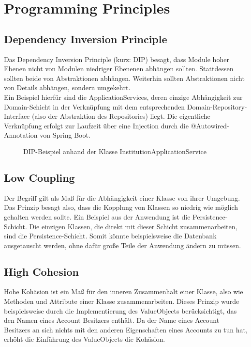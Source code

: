 \section{Programming Principles}
\subsection{Dependency Inversion Principle}
\label{chap:dip}
Das Dependency Inversion Principle (kurz: DIP) besagt, dass Module hoher Ebenen nicht von Modulen niedriger Ebenenen abhängen sollten. Stattdessen sollten beide von Abstraktionen abhängen. Weiterhin sollten Abstraktionen nicht von Details abhängen, sondern umgekehrt.\\
Ein Beispiel hierfür sind die ApplicationServices, deren einzige Abhängigkeit zur Domain-Schicht in der Verknüpfung mit dem entsprechenden Domain-Repository-Interface (also der Abstraktion des Repositories) liegt. Die eigentliche Verknüpfung erfolgt zur Laufzeit über eine Injection durch die @Autowired-Annotation von Spring Boot.
\vspace*{0.5cm}
\begin{figure}[!htb]
    \caption[Dependency Inversion Principle]{DIP-Beispiel anhand der Klasse InstitutionApplicationService}
    \label{fig:dip}
\end{figure}

\subsection{Low Coupling}
Der Begriff  gilt als Maß für die Abhängigkeit einer Klasse von ihrer Umgebung. Das Prinzip  besagt also, dass die Kopplung von Klassen so niedrig wie möglich gehalten werden sollte. Ein Beispiel aus der Anwendung ist die Persistence-Schicht. Die einzigen Klassen, die direkt mit dieser Schicht zusammenarbeiten, sind die  Persistence-Schicht. Somit könnte beispielsweise die Datenbank ausgetauscht werden, ohne dafür große Teile der Anwendung ändern zu müssen.

\subsection{High Cohesion}
Hohe Kohäsion ist ein Maß für den inneren Zusammenhalt einer Klasse, also wie  Methoden und Attribute einer Klasse zusammenarbeiten. Dieses Prinzip wurde beispielsweise durch die Implementierung des ValueObjects  berücksichtigt, das den Namen eines Account Besitzers enthält. Da der Name eines Account Besitzers an sich nichts mit den anderen Eigenschaften eines Accounts zu tun hat, erhöht die Einführung des ValueObjects die Kohäsion.

